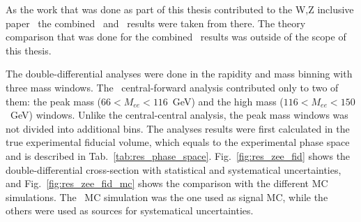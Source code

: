 \begin{figure}
\end{figure}

As the work that was done as part of this thesis contributed to the W,Z inclusive paper~\cite{lib:wz2011} the combined \Zee\ and \Zll\ results were taken from there. The theory comparison that was done for the combined \Zll\ results was outside of the scope of this thesis.

The double-differential analyses were done in the rapidity and mass binning with three mass windows. The \Zee\ central-forward analysis contributed only to two of them: the peak mass ($66 < M_{ee} < 116$~GeV) and the high mass ($116 < M_{ee} < 150$~GeV) windows. Unlike the central-central analysis, the peak mass windows was not divided into additional bins. The analyses results were first calculated in the true experimental fiducial volume, which equals to the experimental phase space and is described in Tab.~\ref{tab:res_phase_space}. Fig.~\ref{fig:res_zee_fid} shows the double-differential cross-section with statistical and systematical uncertainties, and Fig.~\ref{fig:res_zee_fid_mc} shows the comparison with the different MC simulations. The \Powheg\Pythia\ MC simulation was the one used as signal MC, while the others were used as sources for systematical uncertainties.

